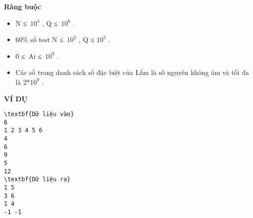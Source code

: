 \textbf{Ràng buộc
}
\begin{itemize}
	\item N ≤ $10^{4}$ , Q ≤ $10^{6}$ .
	\item 60\% số test N ≤ $10^{3}$ , Q ≤ $10^{5}$ .
	\item 0 ≤ Ai ≤ $10^{9}$ .
	\item Các số trong danh sách số đặc biệt của Lắm là số nguyên không âm và tối đa là 2*$10^{9}$ .
\end{itemize}
\textbf{VÍ DỤ
}
\begin{verbatim}
\textbf{Dữ liệu vào}
6
1 2 3 4 5 6
4
6
9
5
12
\textbf{Dữ liệu ra}
1 5
3 6
1 4
-1 -1
\end{verbatim}